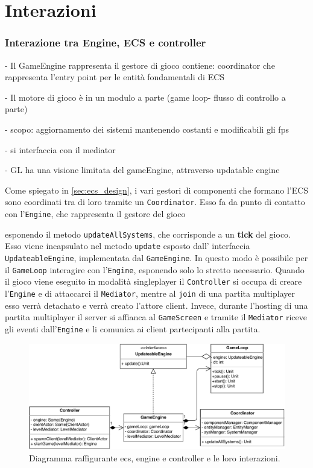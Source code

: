 \section{Interazioni}
\label{sec:interactions_design}

\subsubsection{Interazione tra Engine, ECS e controller}

- Il GameEngine rappresenta il gestore di gioco contiene:
coordinator che rappresenta l'entry point per le entità fondamentali di ECS

- Il motore di gioco è in un modulo a parte (game loop- flusso di controllo a parte)

- scopo: aggiornamento dei sistemi mantenendo costanti e modificabili gli fps

- si interfaccia con il mediator

- GL ha una visione limitata del gameEngine, attraverso updatable engine 




Come spiegato in \ref{sec:ecs_design}, i vari gestori di componenti che formano l'ECS sono coordinati tra di loro tramite un \texttt{Coordinator}. Esso fa da punto di contatto con l'\texttt{Engine}, che rappresenta il gestore del gioco


esponendo il metodo \texttt{updateAllSystems}, che corrisponde a un \textbf{tick} del gioco. Esso viene incapsulato nel metodo \texttt{update} esposto dall' interfaccia \texttt{UpdateableEngine}, implementata dal \texttt{GameEngine}. In questo modo è possibile per il \texttt{GameLoop} interagire con l'\texttt{Engine}, esponendo solo lo stretto necessario.
Quando il gioco viene eseguito in modalità singleplayer il \texttt{Controller} si occupa di creare l'\texttt{Engine} e di attaccarci il \texttt{Mediator}, mentre al \texttt{join} di una partita multiplayer esso verrà detachato e verrà creato l'attore client. Invece, durante l'hosting di una partita multiplayer il server si affianca al \texttt{GameScreen} e tramite il \texttt{Mediator} riceve gli eventi dall'\texttt{Engine} e li comunica ai client partecipanti alla partita.
\begin{figure}[H]
	\centering
	\includegraphics[width=\columnwidth]{drawio/ECS-engine-controller/ecs-engine-controller.pdf}
	\caption{Diagramma raffigurante ecs, engine e controller e le loro interazioni.}
	\label{fig:ecs-engine-controller}
\end{figure}



